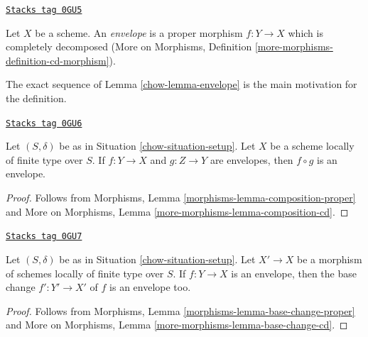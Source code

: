 \begin{definition}[Envelope]
\label{chow-definition-envelope}
\href{https://stacks.math.columbia.edu/tag/0GU5}{\texttt{Stacks tag 0GU5}}

\begin{reference}
\cite[Definition 18.3]{F}
\end{reference}
Let $X$ be a scheme. An {\it envelope} is a proper morphism $f : Y \to X$
which is completely decomposed
(More on Morphisms, Definition \ref{more-morphisms-definition-cd-morphism}).
\end{definition}

The exact sequence of Lemma \ref{chow-lemma-envelope}
is the main motivation for the definition.

\begin{lemma}
\label{chow-lemma-composition-envelope}
\href{https://stacks.math.columbia.edu/tag/0GU6}{\texttt{Stacks tag 0GU6}}

Let $(S, \delta)$ be as in Situation \ref{chow-situation-setup}.
Let $X$ be a scheme locally of finite type over $S$.
If $f : Y \to X$ and $g : Z \to Y$ are envelopes, then
$f \circ g$ is an envelope.
\end{lemma}

\begin{proof}
Follows from Morphisms, Lemma \ref{morphisms-lemma-composition-proper}
and More on Morphisms, Lemma \ref{more-morphisms-lemma-composition-cd}.
\end{proof}

\begin{lemma}
\label{chow-lemma-base-change-envelope}
\href{https://stacks.math.columbia.edu/tag/0GU7}{\texttt{Stacks tag 0GU7}}

Let $(S, \delta)$ be as in Situation \ref{chow-situation-setup}.
Let $X' \to X$ be a morphism of schemes locally of finite type over $S$.
If $f : Y \to X$ is an envelope, then the base change $f' : Y' \to X'$
of $f$ is an envelope too.
\end{lemma}

\begin{proof}
Follows from Morphisms, Lemma \ref{morphisms-lemma-base-change-proper}
and More on Morphisms, Lemma \ref{more-morphisms-lemma-base-change-cd}.
\end{proof}

